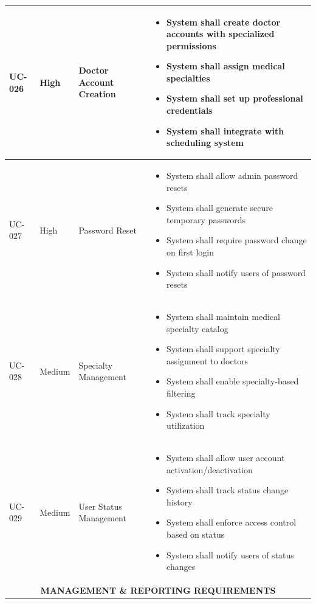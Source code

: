 \documentclass[12pt,a4paper]{article}
\begin{document}
\begin{longtable}{|p{1.2cm}|p{2.5cm}|p{3.5cm}|p{6.8cm}|}
\hline
UC-026 & High & Doctor Account Creation & 
\begin{itemize}[leftmargin=*,topsep=1pt,partopsep=0pt,parsep=0pt,itemsep=1pt]
\item System shall create doctor accounts with specialized permissions
\item System shall assign medical specialties
\item System shall set up professional credentials
\item System shall integrate with scheduling system
\end{itemize} \\
\hline
UC-027 & High & Password Reset & 
\begin{itemize}[leftmargin=*,topsep=1pt,partopsep=0pt,parsep=0pt,itemsep=1pt]
\item System shall allow admin password resets
\item System shall generate secure temporary passwords
\item System shall require password change on first login
\item System shall notify users of password resets
\end{itemize} \\
\hline
UC-028 & Medium & Specialty Management & 
\begin{itemize}[leftmargin=*,topsep=1pt,partopsep=0pt,parsep=0pt,itemsep=1pt]
\item System shall maintain medical specialty catalog
\item System shall support specialty assignment to doctors
\item System shall enable specialty-based filtering
\item System shall track specialty utilization
\end{itemize} \\
\hline
UC-029 & Medium & User Status Management & 
\begin{itemize}[leftmargin=*,topsep=1pt,partopsep=0pt,parsep=0pt,itemsep=1pt]
\item System shall allow user account activation/deactivation
\item System shall track status change history
\item System shall enforce access control based on status
\item System shall notify users of status changes
\end{itemize} \\
\hline
\multicolumn{4}{|c|}{\textbf{MANAGEMENT \& REPORTING REQUIREMENTS}} \\

\end{longtable}
\end{document}
